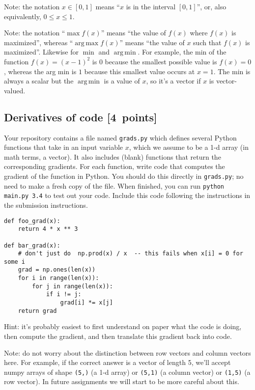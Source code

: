 \documentclass{article}
\newcommand{\blu}[1]{{\textcolor{blu}{#1}}}
\let\ask\blu
\newcommand\pts[1]{\textcolor{pointscolour}{[#1~points]}}
\DeclareMathOperator*{\argmax}{arg\,max}
\DeclareMathOperator*{\argmin}{arg\,min}
\begin{document}
  Note: the notation $x\in [0,1]$ means ``$x$ is in the interval $[0,1]$'', or, also equivalently, $0 \leq x \leq 1$.

  Note: the notation ``$\max f(x)$'' means ``the value of $f(x)$ where $f(x)$ is maximized'', whereas ``$\argmax  f(x)$'' means ``the value of $x$ such that $f(x)$ is maximized''.
  Likewise for $\min$ and $\argmin$. For example, the min of the function $f(x)=(x-1)^2$ is $0$ because the smallest possible value is $f(x)=0$,
  whereas the arg min is $1$ because this smallest value occurs at $x=1$. The min is always a scalar but the $\argmin$ is a value of $x$, so it's a vector
  if $x$ is vector-valued.

  \subsection{Derivatives of code \pts{4}}

  Your repository contains a file named \texttt{grads.py} which defines several Python functions that take in an input variable $x$, which we assume to be a 1-d array (in math terms, a vector).
  It also includes (blank) functions that return the corresponding gradients.
  For each function, \ask{write code that computes the gradient of the function} in Python.
  You should do this directly in \texttt{grads.py}; no need to make a fresh copy of the file. When finished, you can run \texttt{python main.py 3.4} to test out your code. \ask{Include this code following the instructions in the submission instructions.}

  \begin{verbatim}
def foo_grad(x):
    return 4 * x ** 3

def bar_grad(x):
    # don't just do  np.prod(x) / x  -- this fails when x[i] = 0 for some i
    grad = np.ones(len(x))
    for i in range(len(x)):
        for j in range(len(x)):
            if i != j:
                grad[i] *= x[j]
    return grad
  \end{verbatim}

  Hint: it's probably easiest to first understand on paper what the code is doing, then compute
  the gradient, and then translate this gradient back into code.

  Note: do not worry about the distinction between row vectors and column vectors here.
  For example, if the correct answer is a vector of length 5, we'll accept numpy arrays
  of shape \texttt{(5,)} (a 1-d array) or \texttt{(5,1)} (a column vector) or
  \texttt{(1,5)} (a row vector). In future assignments we will start to be more careful
  about this.
\end{document}
